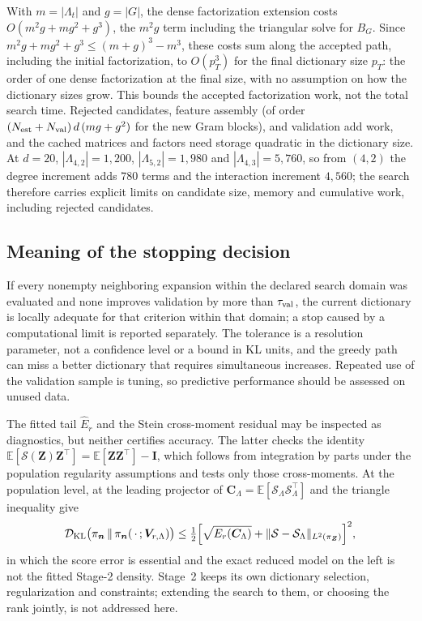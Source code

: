 \documentclass[supplement,review,hidelinks,onefignum,onetabnum]{siamart251216}
\newcommand{\EE}{\mathbb{E}}
\newcommand{\DKL}{\mathcal{D}_{\mathrm{KL}}}
\newcommand{\mC}{\bm{C}}
\newcommand{\mV}{\bm{V}}
\newcommand{\mI}{\bm{I}}
\newcommand{\vn}{\bm{n}}
\newcommand{\vZ}{\bm{Z}}
\newcommand{\scS}{\mathcal{S}}
\begin{document}
With $m = |\Lambda_t|$ and $g = |G|$, the dense factorization extension costs $O(m^2g + mg^2 + g^3)$, the $m^2g$ term including the triangular solve for $B_G$. Since $m^2g + mg^2 + g^3 \le (m+g)^3 - m^3$, these costs sum along the accepted path, including the initial factorization, to $O(p_T^3)$ for the final dictionary size $p_T$: the order of one dense factorization at the final size, with no assumption on how the dictionary sizes grow. This bounds the accepted factorization work, not the total search time. Rejected candidates, feature assembly (of order $(N_{\rm est}+N_{\rm val})\,d\,(mg+g^2)$ for the new Gram blocks), and validation add work, and the cached matrices and factors need storage quadratic in the dictionary size. At $d = 20$, $|\Lambda_{4,2}| = 1{,}200$, $|\Lambda_{5,2}| = 1{,}980$ and $|\Lambda_{4,3}| = 5{,}760$, so from $(4, 2)$ the degree increment adds $780$ terms and the interaction increment $4{,}560$; the search therefore carries explicit limits on candidate size, memory and cumulative work, including rejected candidates.

\subsection{Meaning of the stopping decision}
\label{sm:adapt-variants}

If every nonempty neighboring expansion within the declared search domain was evaluated and none improves validation by more than $\tau_{\rm val}$, the current dictionary is locally adequate for that criterion within that domain; a stop caused by a computational limit is reported separately. The tolerance is a resolution parameter, not a confidence level or a bound in KL units, and the greedy path can miss a better dictionary that requires simultaneous increases. Repeated use of the validation sample is tuning, so predictive performance should be assessed on unused data.

The fitted tail $\widehat E_r$ and the Stein cross-moment residual \cite{Stein1981} may be inspected as diagnostics, but neither certifies accuracy. The latter checks the identity $\EE[\scS(\vZ)\vZ^\top] = \EE[\vZ\vZ^\top] - \mI$, which follows from integration by parts under the population regularity assumptions and tests only those cross-moments. At the population level,  at the leading projector of $\mC_\Lambda = \EE[\scS_\Lambda\scS_\Lambda^\top]$ and the triangle inequality give
\[
  \DKL\bigl(\pi_{\vn}\,\|\,\pi_{\vn}(\,\cdot\,;\mV_{r,\Lambda})\bigr) \le \tfrac12\Bigl[\sqrt{E_r(\mC_\Lambda)} + \|\scS - \scS_\Lambda\|_{L^2(\pi_{\vZ})}\Bigr]^2,
\]
in which the score error is essential and the exact reduced model on the left is not the fitted Stage-2 density. Stage~2 keeps its own dictionary selection, regularization and constraints; extending the search to them, or choosing the rank jointly, is not addressed here.
\end{document}
